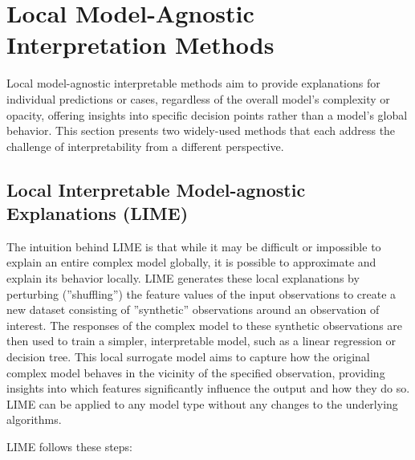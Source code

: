 \section{Local Model-Agnostic Interpretation Methods}

Local model-agnostic interpretable methods aim to provide explanations for individual predictions or cases, regardless of the overall model's complexity or opacity, offering insights into specific decision points rather than a model's global behavior. This section presents two widely-used methods that each address the challenge of interpretability from a different perspective.

\subsection{Local Interpretable Model-agnostic Explanations (LIME)}

The intuition behind LIME is that while it may be difficult or impossible to explain an entire complex model globally, it is possible to approximate and explain its behavior locally. LIME generates these local explanations by perturbing (''shuffling'') the feature values of the input observations to create a new dataset consisting of ''synthetic'' observations around an observation of interest. The responses of the complex model to these synthetic observations are then used to train a simpler, interpretable model, such as a linear regression or decision tree. This local surrogate model aims to capture how the original complex model behaves in the vicinity of the specified observation, providing insights into which features significantly influence the output and how they do so. LIME can be applied to any model type without any changes to the underlying algorithms. 

LIME follows these steps:


